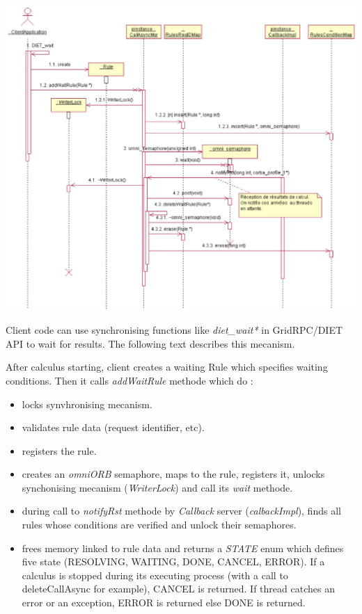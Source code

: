   \hspace{-1 in}
  \includegraphics{./fig/CallAsyncWaitSequenceDiagram.ps}

  Client code can use synchronising functions like \emph{diet\_wait*}
  in GridRPC/DIET API to wait for results. The following text describes
  this mecanism.

  After calculus starting, client creates a waiting Rule which specifies
  waiting conditions. Then it calls \emph{addWaitRule} methode which do :

  \begin{itemize}
  \item locks synvhronising mecanism.
  \item validates rule data (request identifier, etc).
  \item registers the rule.
  \item creates an \emph{omniORB}  semaphore, maps to the rule, registers it,
  unlocks synchonising mecanism (\emph{WriterLock}) and call its \emph{wait} methode.
  \item during call to \emph{notifyRst} methode by \emph{Callback} server
  (\emph{calbackImpl}), finds all rules whose conditions are verified
  and unlock their semaphores.
  \item frees memory linked to rule data and returns a \emph{STATE} enum
  which defines five state (RESOLVING, WAITING, DONE, CANCEL, ERROR). If
  a calculus is stopped during its executing process (with a call to deleteCallAsync for example),
  CANCEL is returned. If thread catches an error or an exception, ERROR is returned else DONE is returned.
  \end{itemize}


